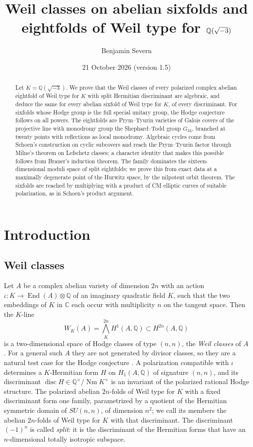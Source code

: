 \documentclass[11pt]{amsart}
\title[Weil classes for $\Q(\sqrt{-3})$]{Weil classes on abelian sixfolds and eightfolds of Weil type for $\Q(\sqrt{-3})$}
\author{Benjamin Severn}
\date{21 October 2026 (version 1.5)}
\theoremstyle{definition}
\theoremstyle{remark}
\newcommand{\Q}{\mathbb Q}
\newcommand{\C}{\mathbb C}
\newcommand{\End}{\operatorname{End}}
\newcommand{\Nm}{\operatorname{Nm}}
\newcommand{\disc}{\operatorname{disc}}
\begin{document}
\begin{abstract}
Let $K=\Q(\sqrt{-3})$. We prove that the Weil classes of every polarized complex abelian eightfold of Weil type for $K$ with split Hermitian discriminant are algebraic, and deduce the same for every abelian sixfold of Weil type for $K$, of every discriminant. For sixfolds whose Hodge group is the full special unitary group, the Hodge conjecture follows on all powers. The eightfolds are Prym--Tyurin varieties of Galois covers of the projective line with monodromy group the Shephard--Todd group $G_{34}$, branched at twenty points with reflections as local monodromy. Algebraic cycles come from Schoen's construction on cyclic subcovers and reach the Prym--Tyurin factor through Milne's theorem on Lefschetz classes; a character identity that makes this possible follows from Brauer's induction theorem. The family dominates the sixteen-dimensional moduli space of split eightfolds; we prove this from exact data at a maximally degenerate point of the Hurwitz space, by the nilpotent orbit theorem. The sixfolds are reached by multiplying with a product of CM elliptic curves of suitable polarization, as in Schoen's product argument.
\end{abstract}
\maketitle

\section{Introduction}

\subsection{Weil classes}
Let $A$ be a complex abelian variety of dimension $2n$ with an action $\iota\colon K\to\End(A)\otimes\Q$ of an imaginary quadratic field $K$, such that the two embeddings of $K$ in $\C$ each occur with multiplicity $n$ on the tangent space. Then the $K$-line
\[
W_K(A)=\textstyle\bigwedge^{2n}_KH^1(A,\Q)\subset H^{2n}(A,\Q)
\]
is a two-dimensional space of Hodge classes of type $(n,n)$, the \emph{Weil classes} of $A$ \cite{Weil}. For a general such $A$ they are not generated by divisor classes, so they are a natural test case for the Hodge conjecture \cite[\S5]{vanGeemen}. A polarization compatible with $\iota$ determines a $K$-Hermitian form $H$ on $H_1(A,\Q)$ of signature $(n,n)$, and its discriminant $\disc H\in\Q^\times/\Nm K^\times$ is an invariant of the polarized rational Hodge structure. The polarized abelian $2n$-folds of Weil type for $K$ with a fixed discriminant form one family, parametrized by a quotient of the Hermitian symmetric domain of $SU(n,n)$, of dimension $n^2$; we call its members the abelian $2n$-folds of Weil type for $K$ with that discriminant. The discriminant $(-1)^n$ is called \emph{split}: it is the discriminant of the Hermitian forms that have an $n$-dimensional totally isotropic subspace.
\end{document}
